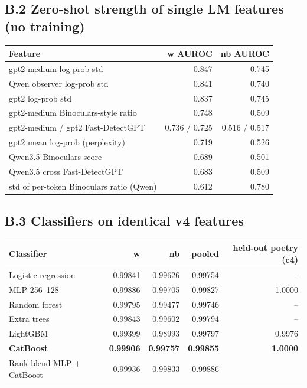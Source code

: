 \documentclass[11pt,letterpaper]{article}
\begin{document}
\subsection*{B.2 Zero-shot strength of single LM features (no training)}
\begin{tabularx}{\linewidth}{@{}Yrr@{}}\toprule Feature & w AUROC & nb AUROC \\ \midrule
gpt2-medium log-prob std & 0.847 & 0.745 \\
Qwen observer log-prob std & 0.841 & 0.740 \\
gpt2 log-prob std & 0.837 & 0.745 \\
gpt2-medium Binoculars-style ratio & 0.748 & 0.509 \\
gpt2-medium / gpt2 Fast-DetectGPT & 0.736 / 0.725 & 0.516 / 0.517 \\
gpt2 mean log-prob (perplexity) & 0.719 & 0.526 \\
Qwen3.5 Binoculars score & 0.689 & 0.501 \\
Qwen3.5 cross Fast-DetectGPT & 0.683 & 0.509 \\
std of per-token Binoculars ratio (Qwen) & 0.612 & 0.780 \\
\bottomrule\end{tabularx}

\subsection*{B.3 Classifiers on identical v4 features}
\begin{tabularx}{\linewidth}{@{}Yrrrr@{}}\toprule Classifier & w & nb & pooled & held-out poetry (c4) \\ \midrule
Logistic regression & 0.99841 & 0.99626 & 0.99754 & -- \\
MLP 256--128 & 0.99886 & 0.99705 & 0.99827 & 1.0000 \\
Random forest & 0.99795 & 0.99477 & 0.99746 & -- \\
Extra trees & 0.99843 & 0.99602 & 0.99794 & -- \\
LightGBM & 0.99399 & 0.98993 & 0.99797 & 0.9976 \\
\textbf{CatBoost} & \textbf{0.99906} & \textbf{0.99757} & \textbf{0.99855} & \textbf{1.0000} \\
Rank blend MLP + CatBoost & 0.99936 & 0.99833 & 0.99886 & \\
\bottomrule\end{tabularx}
\end{document}
